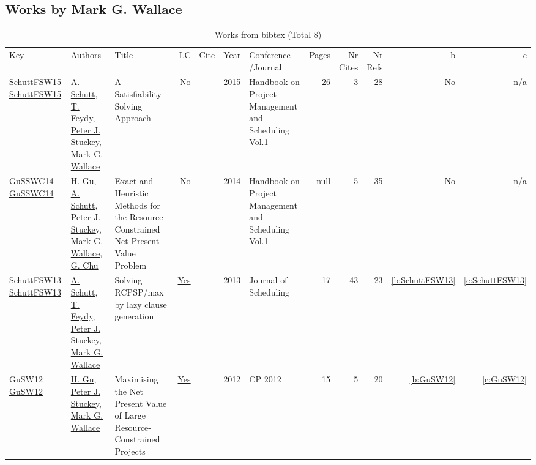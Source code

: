 \subsection{Works by Mark G. Wallace}
\label{sec:a156}
{\scriptsize
\begin{longtable}{>{\raggedright\arraybackslash}p{3cm}>{\raggedright\arraybackslash}p{6cm}>{\raggedright\arraybackslash}p{6.5cm}rrrp{2.5cm}rrrrr}
\rowcolor{white}\caption{Works from bibtex (Total 8)}\\ \toprule
\rowcolor{white}Key & Authors & Title & LC & Cite & Year & \shortstack{Conference\\/Journal} & Pages & \shortstack{Nr\\Cites} & \shortstack{Nr\\Refs} & b & c \\ \midrule\endhead
\bottomrule
\endfoot
SchuttFSW15 \href{https://doi.org/10.1007/978-3-319-05443-8_7}{SchuttFSW15} & \hyperref[auth:a125]{A. Schutt}, \hyperref[auth:a155]{T. Feydy}, \hyperref[auth:a126]{Peter J. Stuckey}, \hyperref[auth:a156]{Mark G. Wallace} & A Satisfiability Solving Approach & No & \cite{SchuttFSW15} & 2015 & Handbook on Project Management and Scheduling Vol.1 & 26 & 3 & 28 & No & n/a\\
GuSSWC14 \href{http://dx.doi.org/10.1007/978-3-319-05443-8_14}{GuSSWC14} & \hyperref[auth:a342]{H. Gu}, \hyperref[auth:a125]{A. Schutt}, \hyperref[auth:a126]{Peter J. Stuckey}, \hyperref[auth:a156]{Mark G. Wallace}, \hyperref[auth:a349]{G. Chu} & Exact and Heuristic Methods for the Resource-Constrained Net Present Value Problem & No & \cite{GuSSWC14} & 2014 & Handbook on Project Management and Scheduling Vol.1 & null & 5 & 35 & No & n/a\\
SchuttFSW13 \href{https://doi.org/10.1007/s10951-012-0285-x}{SchuttFSW13} & \hyperref[auth:a125]{A. Schutt}, \hyperref[auth:a155]{T. Feydy}, \hyperref[auth:a126]{Peter J. Stuckey}, \hyperref[auth:a156]{Mark G. Wallace} & Solving RCPSP/max by lazy clause generation & \href{works/SchuttFSW13.pdf}{Yes} & \cite{SchuttFSW13} & 2013 & Journal of Scheduling & 17 & 43 & 23 & \ref{b:SchuttFSW13} & \ref{c:SchuttFSW13}\\
GuSW12 \href{https://doi.org/10.1007/978-3-642-33558-7\_55}{GuSW12} & \hyperref[auth:a342]{H. Gu}, \hyperref[auth:a126]{Peter J. Stuckey}, \hyperref[auth:a156]{Mark G. Wallace} & Maximising the Net Present Value of Large Resource-Constrained Projects & \href{works/GuSW12.pdf}{Yes} & \cite{GuSW12} & 2012 & CP 2012 & 15 & 5 & 20 & \ref{b:GuSW12} & \ref{c:GuSW12}\\

\end{longtable}}
